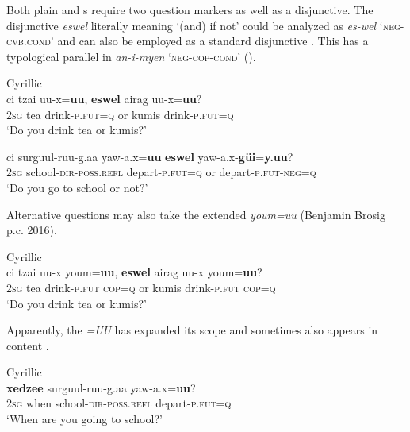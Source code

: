 Both plain and s require two question markers as well as a disjunctive. The disjunctive \textit{eswel} literally meaning ‘(and) if not’ could be analyzed as \textit{es-wel} ‘\textsc{neg-cvb}.\textsc{cond}’ and can also be employed as a standard disjunctive \citep[221]{Janhunen2012c}. This has a typological parallel in  \textit{an-i-myen} ‘\textsc{neg}-\textsc{cop}-\textsc{cond}’ ().

\ea%
    \label{ex:mong:17}
    Cyrillic  \\
    \ea
    \gll ci  tzai  uu-x=\textbf{{uu}}, \textbf{{eswel}} airag  uu-x=\textbf{{uu}}?\\
    2\textsc{sg}  tea  drink-\textsc{p}.\textsc{fut=q}  or  kumis  drink-\textsc{p}.\textsc{fut}=\textsc{q}\\
    \glt ‘Do you drink tea or kumis?’
    
    \ex
    \gll ci  surguul-ruu-g.aa  yaw-a.x=\textbf{uu}    \textbf{eswel} {yaw-a.x-}\textbf{{güi}}{=}\textbf{{y.uu}}?\\
    2\textsc{sg}  school-\textsc{dir}-\textsc{poss}.\textsc{refl}  depart-\textsc{p}.\textsc{fut}=\textsc{q} or  depart-\textsc{p}.\textsc{fut}-\textsc{neg}=\textsc{q}\\
    \glt ‘Do you go to school or not?’
    \z
    \z

Alternative questions may also take the extended  \textit{youm=uu} (Benjamin Brosig p.c. 2016).

\ea%
    \label{ex:mong:18}
    Cyrillic  \\
    \gll ci  tzai  uu-x    youm=\textbf{{uu}}, \textbf{{eswel}} airag  uu-x {youm=}\textbf{{uu}}?\\
    2\textsc{sg}  tea  drink-\textsc{p}.\textsc{fut}  \textsc{cop}=\textsc{q}    or  kumis  drink-\textsc{p}.\textsc{fut} \textsc{cop}=\textsc{q}\\
    \glt ‘Do you drink tea or kumis?’
    \z

Apparently, the  \textit{=UU} has expanded its scope and sometimes also appears in content .

\ea%
    \label{ex:mong:19}
    Cyrillic  \\
     \textbf{{xedzee}} surguul-ruu-g.aa  yaw-a.x=\textbf{{uu}}?\\
    2\textsc{sg}  when    school-\textsc{dir}-\textsc{poss}.\textsc{refl}  depart-\textsc{p}.\textsc{fut}=\textsc{q}\\
    \glt ‘When are you going to school?’
    \z

